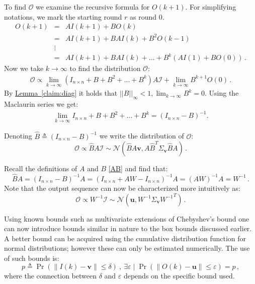 \documentclass[preprint,12pt]{elsarticle}
\newcommand{\namedref}[2]{\hyperref[#2]{#1~\ref*{#2}}}
\newcommand{\lemmaref}[1]{\namedref{Lemma}{#1}}
\newcommand\norm[1]{\left|\left|#1\right|\right|}
\newcommand{\uu}{\mathbf{u}}
\newcommand{\vv}{\mathbf{v}}
\newcommand{\Ir}[1]{I(#1)}
\newcommand{\Or}[1]{O(#1)}
\begin{document}
To find $\mathcal{O}$ we examine the recursive formula for $\Or{k+1}$. For simplifying notations, we mark the starting
round $r$ as round $0$.
\begin{eqnarray*}
  \Or{k+1} & = & A \Ir{k+1}+B \Or{k}\\
                     & = & A \Ir{k+1}+B A \Ir{k}+B^2\Or{k-1}\\
                     & \vdots & \\
                     & = & A \Ir{k+1}+B A\Ir{k}+\ldots+B^k (A \Ir{1}+B\Or{0})\,.
\end{eqnarray*}
Now we take $k\rightarrow\infty$ to find the distribution $\mathcal{O}$:
\begin{eqnarray}\label{eq:recursiveForm}
  \mathcal{O} \propto \lim_{k\rightarrow\infty}(I_{n \times n}+B+B^2+\ldots+B^{k}) A \mathcal{I}+\lim_{k\rightarrow\infty}B^{k+1} \Or{0}\,.
\end{eqnarray}
By \lemmaref{claim:diag} it holds that $\norm{B}_\infty < 1, \lim_{k\rightarrow\infty}B^{k} = 0$. Using the Maclaurin series we get:
\begin{eqnarray*}
  \lim_{k\rightarrow\infty}I_{n \times n}+B+B^2+\ldots+B^k = (I_{n \times n}-B)^{-1}.
\end{eqnarray*}

Denoting $\hat{B} \triangleq (I_{n \times n}-B)^{-1}$ we write the distribution of $\mathcal{O}$:
\begin{equation*}
  \mathcal{O} \propto  \hat{B}A \mathcal{I} \sim \mathcal{N}(\hat{B} A \vv, A \hat{B}^T \Sigma_{\vv} \hat{B} A)\,.
\end{equation*}

Recall the definitions of $A$ and $B$ \eqref{AB} and find that:
\begin{equation*}
  \hat{B}A  =(I_{n \times n}-B)^{-1} A = (I_{n \times n}+A W-I_{n \times n})^{-1} A = (A W)^{-1} A = W^{-1}\,.
\end{equation*}
Note that the output sequence can now be characterized more intuitively as:
\begin{equation*}
  \mathcal{O} \propto  W^{-1} \mathcal{I} \sim \mathcal{N}(\uu, W^{-1} \Sigma_{\vv} {W^{-1}}^T)\,.
\end{equation*}

Using known bounds such as multivariate extensions of Chebyshev's bound one can now introduce bounds similar in nature to the box bounds discussed earlier. A better bound can be acquired using the cumulative distribution function for normal distributions; however these can only be estimated numerically. The use of such bounds is:
\begin{equation*}
  p \triangleq \Pr(\|\Ir{k}-\vv\| \leq \delta)\ ,\ \exists \varepsilon \mid \Pr(\|\Or{k}-\uu\| \leq \varepsilon) = p\,,
\end{equation*}
where the connection between $\delta$ and $\varepsilon$ depends on the specific bound used.
\end{document}
